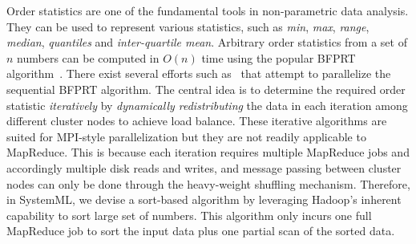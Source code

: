 Order statistics are one of the fundamental tools in non-parametric data analysis. They can be used to represent various statistics, such as \textit{min}, \textit{max}, \textit{range}, \textit{median}, \textit{quantiles} and \textit{inter-quartile mean}.
Arbitrary order statistics from a set of $n$ numbers can be computed in $O(n)$ time using the popular BFPRT algorithm~\cite{blum1973time}. There exist several efforts such as~\cite{bader2004improved} that attempt to parallelize the sequential BFPRT algorithm. The central idea is to determine the required order statistic {\em iteratively} by {\em dynamically redistributing} the data in each iteration among different cluster nodes to achieve load balance. These iterative algorithms are suited for MPI-style parallelization but they are not readily applicable to MapReduce. This is because each iteration requires multiple MapReduce jobs and accordingly multiple disk reads and writes, and message passing between cluster nodes can only be done through the heavy-weight shuffling mechanism. Therefore, in SystemML, we devise a sort-based algorithm by leveraging Hadoop's inherent capability to sort large set of numbers. This algorithm only incurs one full MapReduce job to sort the input data plus one partial scan of the sorted data. %

